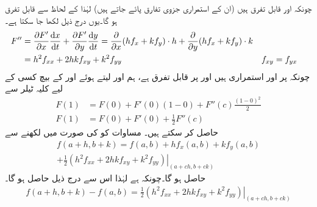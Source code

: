 چونکہ  اور   قابل تفرق   ہیں (ان کے استمراری جزوی تفارق پائے جاتے ہیں)     لہٰذا  کے لحاظ سے  قابل تفرق ہو گا۔یوں درج ذیل لکھا جا سکتا ہے۔
\begin{align*}
F''&=\frac{\partial F'}{\partial x}\frac{\dif x}{\dif t}+\frac{\partial F'}{\partial y}\frac{\dif y}{\dif t}=\frac{\partial}{\partial x}(hf_x+kf_y)\cdot h+\frac{\partial}{\partial y}(hf_x+kf_y)\cdot k\\
&=h^2f_{xx}+2hkf_{xy}+k^2f_{yy}&&f_{xy}=f_{yx}
\end{align*} 
چونکہ  پر  اور  استمراری ہیں اور  پر  قابل تفرق ہے، ہم  اور  لیتے ہوئے    اور  کے بیچ  کسی  کے لیے کلیہ ٹیلر سے
\begin{align}
F(1)&=F(0)+F'(0)(1-0)+F''(c)\frac{(1-0)^2}{2}\nonumber\\
F(1)&=F(0)+F'(0)+\frac{1}{2}F''(c)\label{مساوات_کثیرالمتغیر_ٹیلر_الف}
\end{align}
 حاصل کر سکتے ہیں۔ مساوات  کو  کی صورت میں لکھنے سے
\begin{multline}\label{مساوات_کثیرالمتغیر_ٹیلر_ب}
f(a+h,b+k)=f(a,b)+hf_x(a,b)+kf_y(a,b)\\
+\left.\frac{1}{2}(h^2f_{xx}+2hkf_{xy}+k^2f_{yy})\right\vert_{(a+ch,b+ck)}
\end{multline}
حاصل ہو گا۔چونکہ  ہے  لہٰذا اس سے درج ذیل حاصل ہو گا۔
\begin{align}\label{مساوات_کثیرالمتغیر_ٹیلر_پ}
f(a+h,b+k)-f(a,b)=\left.\frac{1}{2}(h^2f_{xx}+2hkf_{xy}+k^2f_{yy})\right\vert_{(a+ch,b+ck)}
\end{align}

